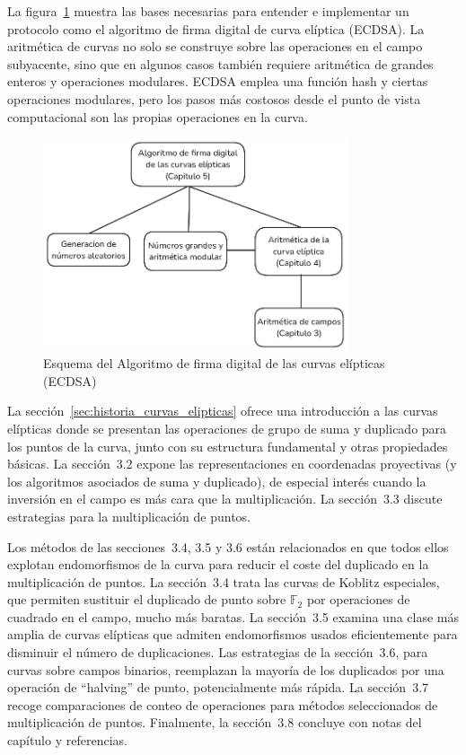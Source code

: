 La figura~\ref{fig:ECDSA_esquema} muestra las bases necesarias para entender e implementar un protocolo como el algoritmo de firma digital de curva elíptica (ECDSA). La aritmética de curvas no solo se construye sobre las operaciones en el campo subyacente, sino que en algunos casos también requiere aritmética de grandes enteros y operaciones modulares. ECDSA emplea una función hash y ciertas operaciones modulares, pero los pasos más costosos desde el punto de vista computacional son las propias operaciones en la curva.
\begin{figure}[H]
    \centering
    \includegraphics[width=0.8\textwidth]{imagenes/ECDSA_esquema.png}
    \caption{Esquema del Algoritmo de firma digital de las curvas elípticas (ECDSA)}
    \label{fig:ECDSA_esquema}
\end{figure}
La sección~\ref{sec:historia_curvas_elipticas} ofrece una introducción a las curvas elípticas donde se presentan las operaciones de grupo de suma y duplicado para los puntos de la curva, junto con su estructura fundamental y otras propiedades básicas. La sección~3.2 expone las representaciones en coordenadas proyectivas (y los algoritmos asociados de suma y duplicado), de especial interés cuando la inversión en el campo es más cara que la multiplicación. La sección~3.3 discute estrategias para la multiplicación de puntos.

Los métodos de las secciones~3.4, 3.5 y 3.6 están relacionados en que todos ellos explotan endomorfismos de la curva para reducir el coste del duplicado en la multiplicación de puntos. La sección~3.4 trata las curvas de Koblitz especiales, que permiten sustituir el duplicado de punto sobre \(\mathbb{F}_2\) por operaciones de cuadrado en el campo, mucho más baratas. La sección~3.5 examina una clase más amplia de curvas elípticas que admiten endomorfismos usados eficientemente para disminuir el número de duplicaciones. Las estrategias de la sección~3.6, para curvas sobre campos binarios, reemplazan la mayoría de los duplicados por una operación de “halving” de punto, potencialmente más rápida. La sección~3.7 recoge comparaciones de conteo de operaciones para métodos seleccionados de multiplicación de puntos. Finalmente, la sección~3.8 concluye con notas del capítulo y referencias.


